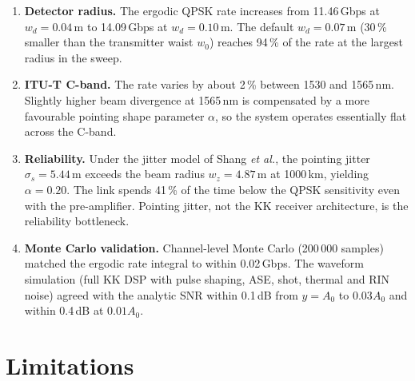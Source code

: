 \begin{enumerate}
\item \textbf{Detector radius.} The ergodic QPSK rate increases from 11.46\,Gbps at $w_d=0.04$\,m to 14.09\,Gbps at $w_d=0.10$\,m. The default $w_d=0.07$\,m (30\,\% smaller than the transmitter waist $w_0$) reaches 94\,\% of the rate at the largest radius in the sweep.

\item \textbf{ITU-T C-band.} The rate varies by about 2\,\% between 1530 and 1565\,nm. Slightly higher beam divergence at 1565\,nm is compensated by a more favourable pointing shape parameter $\alpha$, so the system operates essentially flat across the C-band.

\item \textbf{Reliability.} Under the jitter model of Shang \emph{et al.}, the pointing jitter $\sigma_s=5.44$\,m exceeds the beam radius $w_z=4.87$\,m at 1000\,km, yielding $\alpha=0.20$. The link spends 41\,\% of the time below the QPSK sensitivity even with the pre-amplifier. Pointing jitter, not the KK receiver architecture, is the reliability bottleneck.

\item \textbf{Monte Carlo validation.} Channel-level Monte Carlo (200\,000 samples) matched the ergodic rate integral to within 0.02\,Gbps. The waveform simulation (full KK DSP with pulse shaping, ASE, shot, thermal and RIN noise) agreed with the analytic SNR within 0.1\,dB from $y=A_0$ to $0.03A_0$ and within 0.4\,dB at $0.01A_0$.
\end{enumerate}

\section{Limitations}

